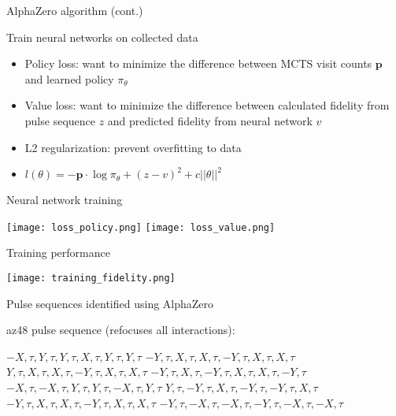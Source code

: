 \documentclass{beamer}
\begin{document}
\begin{frame}{AlphaZero algorithm (cont.)}

Train neural networks on collected data

\begin{itemize}

\item
Policy loss: want to minimize the difference between MCTS visit
counts \(\mathbf{p}\) and learned policy \(\pi_\theta\)
\item
Value loss: want to minimize the difference between calculated
fidelity from pulse sequence \(z\) and predicted fidelity from
neural network \(v\)
\item
L2 regularization: prevent overfitting to data
\item
\(l(\theta) = -\mathbf{p} \cdot \log\pi_\theta + (z - v)^2 + c||\theta||^2\)
\end{itemize}
\end{frame}


\begin{frame}{Neural network training}

\texttt{[image: loss\_policy.png]}
\texttt{[image: loss\_value.png]}
\end{frame}

\begin{frame}{Training performance}

\texttt{[image: training\_fidelity.png]}
\end{frame}

\begin{frame}{Pulse sequences identified using AlphaZero}

\textrm{az48} pulse sequence (refocuses all interactions):

$ -X, \tau, Y, \tau, Y, \tau, X, \tau, Y, \tau, Y, \tau $
$ -Y, \tau, X, \tau, X, \tau, -Y, \tau, X, \tau, X, \tau $
$ Y, \tau, X, \tau, X, \tau, -Y, \tau, X, \tau, X, \tau $
$ -Y, \tau, X, \tau, -Y, \tau, X, \tau, X, \tau, -Y, \tau $
$ -X, \tau, -X, \tau, Y, \tau, Y, \tau, -X, \tau, Y, \tau $
$ Y, \tau, -Y, \tau, X, \tau, -Y, \tau, -Y, \tau, X, \tau $
$ -Y, \tau, X, \tau, X, \tau, -Y, \tau, X, \tau, X, \tau $
$ -Y, \tau, -X, \tau, -X, \tau, -Y, \tau, -X, \tau, -X, \tau $

\end{frame}
\end{document}
